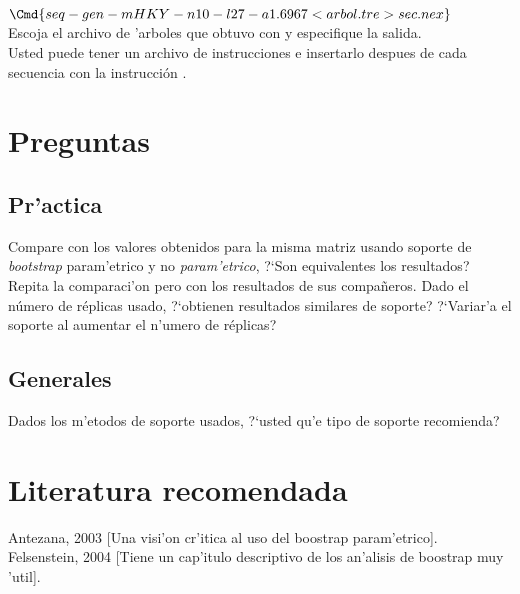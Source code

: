 \begin{math}
\Cmd{seq-gen -mHKY -n10 -l27 -a1.6967 <arbol.tre >sec.nex}
\end{math}\\ 

Escoja el archivo de 'arboles que obtuvo con  y especifique la salida.\\
Usted puede tener un archivo de instrucciones e insertarlo despues de cada secuencia con la instrucci\'on .
\section{Preguntas}
\subsection{Pr'actica}
\noindent
Compare con los valores obtenidos para la misma matriz usando soporte de \textit{bootstrap} param'etrico y no \textit{param'etrico}, ?`Son equivalentes los resultados?\\
Repita la comparaci'on pero con los resultados de sus compa\~neros. Dado el n\'umero de r\'eplicas usado, ?`obtienen resultados similares de soporte? ?`Variar'a el soporte al aumentar el n'umero de r\'eplicas?
\subsection{Generales}
\noindent
Dados los m'etodos de soporte usados, ?`usted qu'e tipo de soporte recomienda?
\section{Literatura recomendada}
\noindent
Antezana, 2003 [Una visi'on cr'itica al uso del boostrap param'etrico].\\
Felsenstein, 2004 [Tiene un cap'itulo descriptivo de los an'alisis de boostrap muy 'util].
